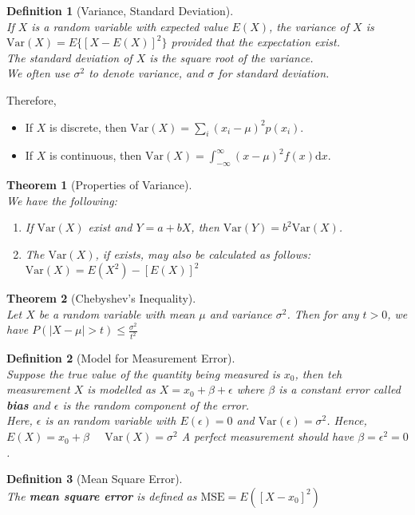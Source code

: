 \documentclass[12pt]{article}
\newcommand{\diff}{\mathrm{d}}
\newcommand{\var}{\mathrm{Var}}
\newtheorem{definition}{Definition}[section]
\newtheorem{theorem}{Theorem}[section]
\theoremstyle{definition}
\begin{document}
\begin{definition}[Variance, Standard Deviation]
\hfill\\\normalfont If $X$ is a random variable with expected value $E(X)$, the variance of $X$ is
$
\var(X) = E\{[X-E(X)]^2\}
$
provided that the expectation exist.\\
The standard deviation of $X$ is the square root of the variance.\\
We often use $\sigma^2$ to denote variance, and $\sigma$ for standard deviation.
\end{definition}
Therefore,
\begin{itemize}
  \item If $X$ is discrete, then $\var(X) = \sum_i (x_i-\mu)^2 p(x_i)$.
  \item If $X$ is continuous, then $\var(X) = \int_{-\infty}^\infty (x-\mu)^2 f(x)\diff x$.
\end{itemize}
\begin{theorem}[Properties of Variance]
\hfill\\\normalfont We have the following:
\begin{enumerate}
  \item If $\var(X)$ exist and $Y=a+bX$, then $\var(Y) = b^2\var(X)$.
  \item The $\var(X)$, if exists, may also be calculated as follows:
  $
\var(X) = E(X^2)-[E(X)]^2
  $
\end{enumerate}
\end{theorem}
\begin{theorem}[Chebyshev's Inequality]
\hfill\\\normalfont Let $X$ be a random variable with mean $\mu$ and variance $\sigma^2$. Then for any $t>0$, we have
$
P(|X-\mu|>t)\leq \frac{\sigma^2}{t^2}
$
\end{theorem}
\begin{definition}[Model for Measurement Error]
\hfill\\\normalfont Suppose the true value of the quantity being measured is $x_0$, then teh measurement $X$ is modelled as
$
X=x_0+\beta+\epsilon
$
where $\beta$ is a constant error called \textbf{bias} and $\epsilon$ is the random component of the error.\\
Here, $\epsilon$ is an random variable with $E(\epsilon)=0$ and $\var(\epsilon) = \sigma^2$. Hence, 
$
E(X) = x_0+\beta\;\;\;\;\;\var(X)=\sigma^2
$
A perfect measurement should have $\beta=\epsilon^2 = 0$.
\end{definition}
\begin{definition}[Mean Square Error]
\hfill\\\normalfont The \textbf{mean square error} is defined as
$
\text{MSE} = E([X-x_0]^2)
$
\end{definition}
\end{document}
